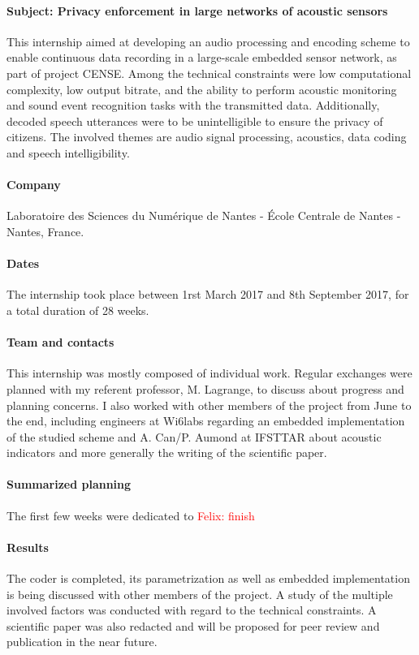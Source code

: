 \documentclass[12pt,times,onecolumn]{article}
\newcommand{\fg}[1]{\textcolor{red}{ Felix: #1}}
\begin{document}
\paragraph{Subject: Privacy enforcement in large networks of acoustic sensors\\}
This internship aimed at developing an audio processing and encoding scheme to enable continuous data recording in a large-scale embedded sensor network, as part of project CENSE. Among the technical constraints were low computational complexity, low output bitrate, and the ability to perform acoustic monitoring and sound event recognition tasks with the transmitted data. Additionally, decoded speech utterances were to be unintelligible to ensure the privacy of citizens. The involved themes are audio signal processing, acoustics, data coding and speech intelligibility.
\paragraph{Company\\}
Laboratoire des Sciences du Num\'erique de Nantes - \'Ecole Centrale de Nantes - Nantes, France.
\paragraph{Dates\\}
The internship took place between 1rst March 2017 and 8th September 2017, for a total duration of 28 weeks.
\paragraph{Team and contacts\\}
This internship was mostly composed of individual work. Regular exchanges were planned with my referent professor, M. Lagrange, to discuss about progress and planning concerns. I also worked with other members of the project from June to the end, including engineers at Wi6labs regarding an embedded implementation of the studied scheme and A. Can/P. Aumond at IFSTTAR about acoustic indicators and more generally the writing of the scientific paper.
\paragraph{Summarized planning\\}
The first few weeks were dedicated to \fg{finish}
\paragraph{Results\\}
The coder is completed, its parametrization as well as embedded implementation is being discussed with other members of the project. A study of the multiple involved factors was conducted with regard to the technical constraints. A scientific paper was also redacted and will be proposed for peer review and publication in the near future.
\end{document}
